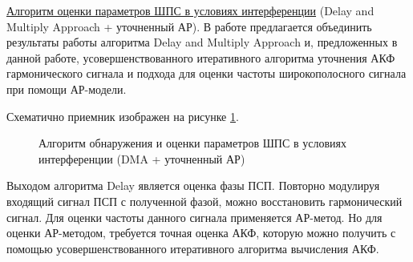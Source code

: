 \underline{Алгоритм оценки параметров ШПС в условиях интерференции} (Delay and Multiply Approach + уточненный АР).
В работе предлагается объединить результаты работы алгоритма Delay and Multiply Approach и, предложенных
в данной работе, усовершенствованного итеративного алгоритма уточнения АКФ гармонического
сигнала и подхода для оценки частоты широкополосного сигнала при помощи АР-модели.

Схематично приемник изображен на рисунке \ref{pic:ar_dma_scheme}.

\begin{figure}[H]
\center{}
	\caption{Алгоритм обнаружения и оценки параметров ШПС в условиях интерференции (DMA + уточненный АР)}
	\label{pic:ar_dma_scheme}
\end{figure}

Выходом алгоритма Delay  является оценка фазы ПСП. Повторно модулируя входящий сигнал ПСП с полученной
фазой, можно восстановить гармонический сигнал. Для оценки частоты данного сигнала применяется
АР-метод. Но для оценки АР-методом, требуется точная оценка АКФ, которую можно получить
с помощью усовершенствованного итеративного алгоритма вычисления АКФ.


